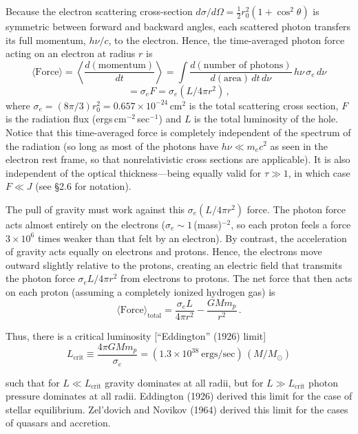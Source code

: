 Because the electron scattering cross-section $d\sigma/d\Omega = \tfrac{1}{2}r_0^2(1+\cos^2\theta)$ is
symmetric between forward and backward angles, each scattered photon transfers
its full momentum, $h\nu/c$, to the electron.  Hence, the time-averaged
photon force acting on an electron at radius $r$ is
%
\begin{equation}
\langle\text{Force}\rangle = \left\langle\frac{d(\text{momentum})}{dt}\right\rangle
= \int \frac{d(\text{number of photons})}{d(\text{area})\,dt\,d\nu}\, h\nu\,\sigma_e\, d\nu
\tag{4.5.2}
\end{equation}
%
\[
= \sigma_e F = \sigma_e (L/4\pi r^2)\,,
\]
%
where $\sigma_e = (8\pi/3)r_0^2 = 0.657 \times 10^{-24}$\,cm$^2$ is the total scattering cross section,
$F$ is the radiation flux (ergs\,cm$^{-2}$\,sec$^{-1}$) and $L$ is the total luminosity of the hole.
Notice that this time-averaged force is completely independent of the spectrum
of the radiation (so long as most of the photons have $h\nu \ll m_e c^2$ as seen in the
electron rest frame, so that nonrelativistic cross sections are applicable).  It is
also independent of the optical thickness---being equally valid for $\tau \gg 1$, in
which case $F \ll J$ (see \S2.6 for notation).

The pull of gravity must work against this $\sigma_e (L/4\pi r^2)$ force.  The photon force
acts almost entirely on the electrons ($\sigma_e \sim 1$\,(mass)$^{-2}$, so each proton feels a
force $3 \times 10^6$ times weaker than that felt by an electron).  By contrast, the
acceleration of gravity acts equally on electrons and protons.  Hence, the electrons
move outward slightly relative to the protons, creating an electric field that
transmits the photon force $\sigma_e L/4\pi r^2$ from electrons to protons.  The net force
that then acts on each proton (assuming a completely ionized hydrogen gas) is
%
\begin{equation}
\langle\text{Force}\rangle_{\text{total}} = \frac{\sigma_e L}{4\pi r^2} - \frac{GMm_p}{r^2}\,.
\tag{4.5.3}
\end{equation}

Thus, there is a critical luminosity [``Eddington'' (1926) limit]
%
\begin{equation}
L_{\text{crit}} \equiv \frac{4\pi G M m_p}{\sigma_e}
= (1.3 \times 10^{38}~\text{ergs/sec})\,(M/M_\odot)
\tag{4.5.4}
\end{equation}

such that for $L \ll L_{\text{crit}}$ gravity dominates at all radii, but for $L \gg L_{\text{crit}}$ photon
pressure dominates at all radii.  Eddington (1926) derived this limit for the case of
stellar equilibrium.  Zel'dovich and Novikov (1964) derived this limit for the
cases of quasars and accretion.

